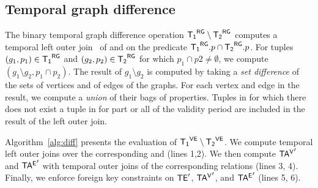 


\subsection{Temporal graph difference}
\label{sec:algebra:diff}

The binary temporal graph difference operation $\mathsf{{T_1}^{RG}} \setminus \mathsf{{T_2}^{RG}}$
computes a temporal left outer join~\cite{Gao2005} of \trga and \trgb
on the predicate $\mathsf{{T_1}^{RG}}.p \cap \mathsf{{T_2}^{RG}}.p$.  For tuples $(g_1, p_1) \in
\mathsf{{T_1}^{RG}}$ and $(g_2, p_2) \in \mathsf{{T_2}^{RG}}$ for which $p_1 \cap p2 \neq
\emptyset$, we compute $(g_1 \setminus g_2, p_1 \cap p_2)$.  The
result of $g_1 \setminus g_2$ is computed by taking a {\em set
  difference} of the sets of vertices and of edges of the graphs.  For
each vertex and edge in the result, we compute a {\em union} of their
bags of properties.  Tuples in \trga for which there does not exist a
tuple in \trgb for part or all of the validity period are included in
the result of the left outer join.

Algorithm~\ref{alg:diff} presents the evaluation of $\mathsf{{T_1}^{VE}} \setminus
\mathsf{{T_2}^{VE}}$.  We compute temporal left outer joins over the corresponding
\tv and \te (lines 1,2).  We then compute $\mathsf{TA^{V}}'$ and $\mathsf{TA^{E}}'$ with
temporal outer joins of the corresponding relations (lines 3, 4).
Finally, we enforce foreign key constraints on $\textsf{TE}'$, $\mathsf{TA^{V}}'$, and
$\mathsf{TA^{E}}'$ (lines 5, 6).

